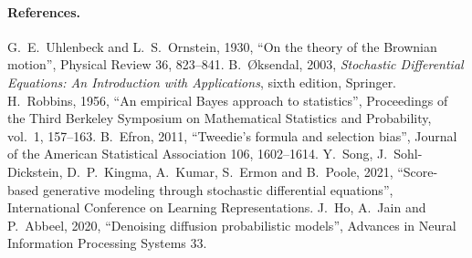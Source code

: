 \paragraph{References.}
G.~E.~Uhlenbeck and L.~S.~Ornstein, 1930, ``On the theory of the Brownian motion'',
Physical Review 36, 823--841.
B.~\O ksendal, 2003, \emph{Stochastic Differential Equations: An Introduction with
Applications}, sixth edition, Springer.
H.~Robbins, 1956, ``An empirical Bayes approach to statistics'', Proceedings of the
Third Berkeley Symposium on Mathematical Statistics and Probability, vol.~1, 157--163.
B.~Efron, 2011, ``Tweedie's formula and selection bias'', Journal of the American
Statistical Association 106, 1602--1614.
Y.~Song, J.~Sohl-Dickstein, D.~P.~Kingma, A.~Kumar, S.~Ermon and B.~Poole, 2021,
``Score-based generative modeling through stochastic differential equations'',
International Conference on Learning Representations.
J.~Ho, A.~Jain and P.~Abbeel, 2020, ``Denoising diffusion probabilistic models'',
Advances in Neural Information Processing Systems 33.

